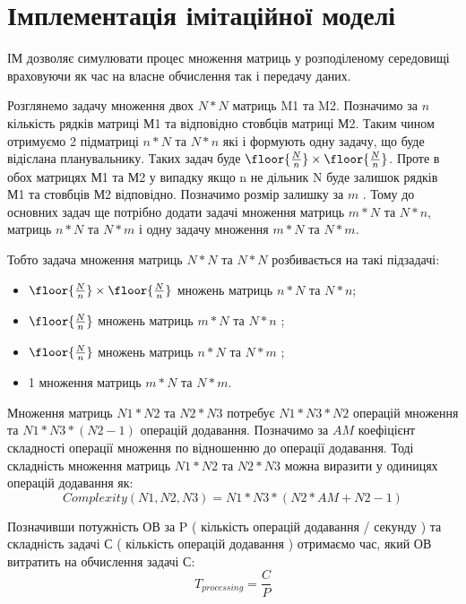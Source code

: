 
\section{Імплементація імітаційної моделі}

ІМ дозволяє симулювати процес множення матриць у розподіленому середовищі враховуючи як час на власне обчислення так і передачу даних.

Розглянемо задачу множення двох $N*N$ матриць M1 та M2. Позначимо за $n$ кількість рядків матриці М1 та відповідно стовбців матриці М2. Таким чином отримуємо 2 підматриці $n*N$ та $N*n$ які і формують одну задачу, що буде відіслана планувальнику. Таких задач буде $ \floor{ \frac{N}{n} } \times \floor{ \frac{N}{n} } $. Проте в обох матрицях М1 та М2 у випадку якщо n не дільник N буде залишок рядків М1 та стовбців М2 відповідно. Позначимо розмір залишку за $m$ . Тому до основних задач ще потрібно додати задачі множення матриць $m*N$ та $N*n$, матриць $n*N$ та $N*m$ і одну задачу множення  $m*N$ та $N*m$.

Тобто задача множення матриць $N*N$ та $N*N$ розбивається на такі підзадачі:
\begin{itemize}
	\item $ \floor{ \frac{N}{n} } \times \floor{ \frac{N}{n} } $ множень матриць $n*N$ та $N*n$;
	\item $ \floor{ \frac{N}{n} } $ множень матриць $m*N$ та $N*n$ ;
	\item $ \floor{ \frac{N}{n} } $ множень матриць $n*N$ та $N*m$ ;
	\item 1 множення матриць $m*N$ та $N*m$.
\end{itemize}

Множення матриць $N1*N2$ та $N2*N3$ потребує $N1*N3*N2$ операцій множення та $N1*N3*(N2-1)$ операцій додавання. Позначимо за $AM$ коефіцієнт складності операції множення по відношенню до операції додавання. Тоді складність множення матриць $N1*N2$ та $N2*N3$ можна виразити у одиницях операцій додавання як:
\begin{equation}
\label{eq:complexity_fmla}
Complexity(N1,N2,N3) = N1*N3*( N2 *AM + N2 - 1)
\end{equation}

Позначивши потужність ОВ за P ( кількість операцій додавання / секунду ) та складність задачі С ( кількість операцій додавання ) отримаємо час, який ОВ витратить на обчислення задачі С:
\begin{equation}
\label{eq:processing_time_simple}
T_{processing} = \frac{C}{P}
\end{equation}

